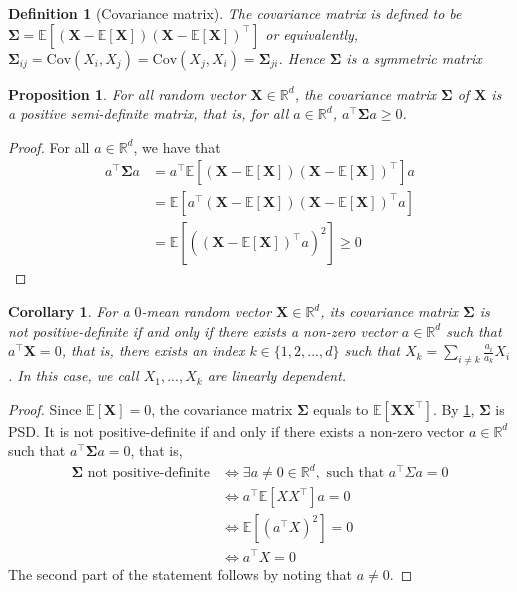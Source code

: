 \documentclass{article}
\newtheorem{corollary}{Corollary}
\newtheorem{definition}{Definition}
\newtheorem{proposition}{Proposition}
\newcommand{\R}{\mathbb{R}}
\DeclareMathOperator*{\1}{\mathbbm{1}}
\newcommand{\E}{\mathbb E}
\renewcommand{\b}[1]{\mathbf{#1}}
\theoremstyle{definition}
\theoremstyle{remark}
\newcommand{\bSig}{\mathbf{\Sigma}}
\begin{document}
  \begin{definition}[Covariance matrix]
    The covariance matrix is defined to be $\mathbf\Sigma=\mathbb E[(\mathbf X-\mathbb E[\mathbf X])(\mathbf X-\mathbb E[\mathbf X])^\top]$ or equivalently, $\mathbf\Sigma_{ij}=\mathrm{Cov}(X_i,X_j) =\mathrm{Cov}(X_j,X_i)=\mathbf\Sigma_{ji}$. Hence $\mathbf\Sigma$ is a symmetric matrix
  \end{definition}
  \begin{proposition}\label{prop:psd_cov}
    For all random vector $\mathbf X\in \mathbb R^d$, the covariance matrix $\mathbf \Sigma$ of $\mathbf X$ is a positive semi-definite matrix, that is, for all $a\in \mathbb R^d$, $a^\top \mathbf \Sigma a\ge 0$.
  \end{proposition}
  \begin{proof}
    For all $a\in \mathbb R^d$, we have that 
    \begin{align*}
      a^\top \mathbf\Sigma a &= a^\top \mathbb E\left[(\mathbf X-\mathbb E[\mathbf X])(\mathbf X-\mathbb E[\mathbf X])^\top\right] a\\
      &=\mathbb E\left[a^\top (\mathbf X-\mathbb E[\mathbf X])(\mathbf X-\mathbb E[\mathbf X])^\top a\right] \tag{Linearity of expectation}\\
      &=\mathbb E\left[((\mathbf X-\mathbb E[\mathbf X])^\top a)^2\right]\ge 0
    \end{align*}
  \end{proof}
  \begin{corollary}
    For a $0$-mean random vector $\mathbf X\in \R^d$, its covariance matrix $\bSig$ is not positive-definite if and only if there exists a non-zero vector $a\in \mathbb R^d$ such that $a^\top \b X = 0$, that is, there exists an index $k\in \{1,2,...,d\}$ such that $X_k = \sum_{i\neq k}\frac{a_i}{a_k} X_i$. In this case, we call $X_1,...,X_k$ are linearly dependent. 
  \end{corollary}
  \begin{proof}
    Since $\E [\b{X}]=0$, the covariance matrix $\bSig$ equals to $\E[\b X\b X^\top]$. By \cref{prop:psd_cov}, $\bSig$ is PSD. It is not positive-definite if and only if there exists a non-zero vector $a\in \R^d$ such that $a^\top \bSig a=0$, that is, 
    \begin{align*}
      \bSig \text{ not positive-definite}&\Longleftrightarrow \exists a\neq 0 \in \R^d, \text{ such that }a^\top \Sigma a=0 \\
      &\Longleftrightarrow a^\top \mathbb E[XX^\top] a=0\\
      &\Longleftrightarrow \E[(a^\top X)^2]=0\\
      &\Longleftrightarrow a^\top X=0
    \end{align*}
    The second part of the statement follows by noting that $a\neq 0$.
  \end{proof}
\end{document}
